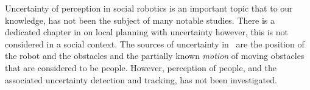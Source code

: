 Uncertainty of perception in social robotics is an important topic that to our knowledge, has not been the subject of many notable studies. There is a dedicated chapter in \cite{correa2014uncertainty} on local planning with uncertainty however, this is not considered in a social context. The sources of uncertainty in~\cite{correa2014uncertainty} are the position of the robot and the obstacles and the partially known \emph{motion} of moving obstacles that are considered to be people. However, perception of people, and the associated uncertainty detection and tracking, has not been investigated.


